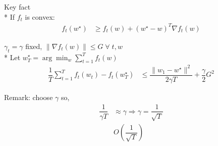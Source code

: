 \documentclass{article}
\begin{document}
Key fact
\\* If $f_{t}$ is convex:
\begin{align*}
f_{t}\left(w^\star \right) &\geq  f_{t}\left(w\right) + \left(w^\star  - w\right)^{T} \nabla  f_{t}\left(w\right)
\end{align*}
\begin{thm} \label{thm:t1} 
$\gamma_{t} = \gamma$ fixed, $\| \nabla  f_{t}\left(w\right) \| \leq  G \;\forall\; t, w $
\\* Let $w^\star _{T} = \arg\displaystyle\min_{w} \displaystyle\sum_{t=1}^{T} f_{t}\left(w\right)$
\begin{align*}
\dfrac{1}{T} \displaystyle\sum_{t=1}^{T} f_{t}\left(w_{t}\right) - f_{t}\left(w^\star _{T}\right) &\leq  \dfrac{\| w_{1} - w^\star  \|^{2}}{2 \gamma T} + \dfrac{\gamma}{2} G^{2}
\end{align*}\end{thm}
Remark: choose $\gamma$ so,
\begin{align*}
\dfrac{1}{\gamma T} &\approx \gamma \Rightarrow  \gamma = \dfrac{1}{\sqrt{T}}
\\ &O\left(\dfrac{1}{\sqrt{T}}\right) 
\end{align*}
\end{document}
